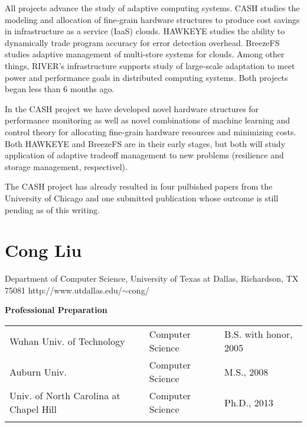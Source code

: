 \documentclass[10pt,letterpaper]{article}
\newcommand{\required}[1]{\section*{\hfil #1\hfil}}                    %
\begin{document}
All projects advance the study of adaptive computing systems.  CASH
studies the modeling and allocation of fine-grain hardware structures
to produce cost savings in infrastructure as a service (IaaS) clouds.
HAWKEYE studies the ability to dynamically trade program accuracy for
error detection overhead.  BreezeFS studies adaptive management of
multi-store systems for clouds.  Among other things, RIVER's
infrastructure supports study of large-scale adaptation to meet power
and performance goals in distributed computing systems.  Both projects
began less than 6 months ago.

 In the CASH project we have
developed novel hardware structures for performance monitoring as well
as novel combinations of machine learning and control theory for
allocating fine-grain hardware resources and minimizing costs.  Both
HAWKEYE and BreezeFS are in their early stages, but both will study
application of adaptive tradeoff management to new problems
(resilience and storage management, respectivel).  

 The CASH project has already resulted
in four pulbished papers from the University of Chicago
\cite{cpsna,POET,FSE2015,JouleGuard} and one submitted publication
whose outcome is still pending as of this writing.


\newpage
{}

 



\newpage
{}
\thispagestyle{empty}

\required{Cong Liu}
\vspace{-3mm}
\begin{center}
Department of Computer Science, University of Texas at Dallas, Richardson, TX 75081
http://www.utdallas.edu/$\sim$cong/
\end{center}


\noindent \textbf{Professional Preparation}\

	\begin{tabular}{l l l}
		Wuhan Univ. of Technology &  Computer Science & B.S. with honor, 2005 \\
		Auburn Univ. & Computer Science & M.S., 2008 \\
		Univ. of North Carolina at Chapel Hill & Computer Science & Ph.D., 2013\\ \\
	\end{tabular}
\end{document}
